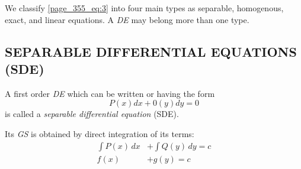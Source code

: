 \documentclass[11pt]{amsbook}
\begin{document}
We classify \ref{page_355_eq:3} into four main types as separable, homogenous, exact, and linear equations. A \textit{DE} may belong more than one type. 
\subsection{SEPARABLE DIFFERENTIAL EQUATIONS (SDE)}

A first order \textit{DE} which can be written or having the form 
\begin{equation}\label{page_355_eq:4}
P(x)dx + 0(y)dy = 0
\end{equation}
is called a \textit{separable differential equation} (SDE). 

Its \textit{GS} is obtained by direct integration of its terms:
\begin{align*}
 \int P(x)\,dx &+  \int Q(y)\,dy = c \\
f(x) &+ g(y) = c
\end{align*}


\end{document}
